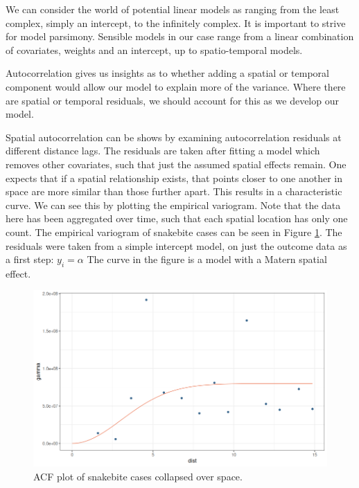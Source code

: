 \documentclass{article}
\begin{document}
We can consider the world of potential linear models as ranging from the least complex, simply an intercept, to the infinitely complex. It is important to strive for model parsimony. Sensible models in our case range from a linear combination of covariates, weights and an intercept, up to spatio-temporal models.

Autocorrelation gives us insights as to whether adding a spatial or temporal component would allow our model to explain more of the variance. Where there are spatial or temporal residuals, we should account for this as we develop our model.

Spatial autocorrelation can be shows by examining autocorrelation residuals at different distance lags. The residuals are taken after fitting a model which removes other covariates, such that just the assumed spatial effects remain. One expects that if a spatial relationship exists, that points closer to one another in space are more similar than those further apart. This results in a characteristic curve. We can see this by plotting the empirical variogram. Note that the data here has been aggregated over time, such that each spatial location has only one count. The empirical variogram of snakebite cases can be seen in Figure \ref{fig:varioverview}. The residuals were taken from a simple intercept model, on just the outcome data as a first step: $y_i = \alpha$ The curve in the figure is a model with a Matern spatial effect.

\begin{figure}[h]
    \centering
    \includegraphics[scale=0.5]{images/varioverview.png}
    \caption{ACF plot of snakebite cases collapsed over space.}
    \label{fig:varioverview}
\end{figure}
\end{document}
